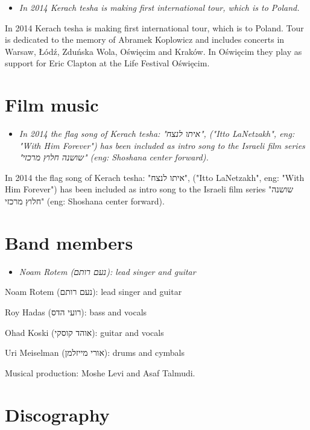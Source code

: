 \begin{itemize}
\item
  \emph{In 2014 Kerach tesha is making first international tour, which
  is to Poland.}
\end{itemize}

In 2014 Kerach tesha is making first international tour, which is to
Poland. Tour is dedicated to the memory of Abramek Koplowicz and
includes concerts in Warsaw, Łódź, Zduńska Wola, Oświęcim and Kraków. In
Oświęcim they play as support for Eric Clapton at the Life Festival
Oświęcim.

\section{Film music}\label{film-music}

\begin{itemize}
\item
  \emph{In 2014 the flag song of Kerach tesha: "איתו לנצח", ("Itto
  LaNetzakh", eng: "With Him Forever") has been included as intro song
  to the Israeli film series "שושנה חלוץ מרכזי" (eng: Shoshana center
  forward).}
\end{itemize}

In 2014 the flag song of Kerach tesha: "איתו לנצח", ("Itto LaNetzakh",
eng: "With Him Forever") has been included as intro song to the Israeli
film series "שושנה חלוץ מרכזי" (eng: Shoshana center forward).

\section{Band members}\label{band-members}

\begin{itemize}
\item
  \emph{Noam Rotem (נעם רותם): lead singer and guitar}
\end{itemize}

Noam Rotem (נעם רותם): lead singer and guitar

Roy Hadas (רועי הדס): bass and vocals

Ohad Koski (אוהד קוסקי): guitar and vocals

Uri Meiselman (אורי מייזלמן): drums and cymbals

Musical production: Moshe Levi and Asaf Talmudi.

\section{Discography}\label{discography}


